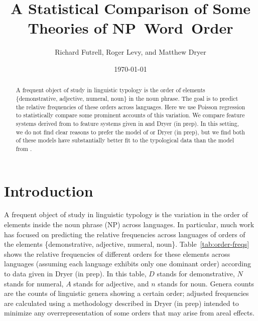 \documentclass[11pt]{article}
\title{A Statistical Comparison of Some Theories of NP~Word~Order}
\author{Richard Futrell, Roger Levy, and Matthew Dryer}
\date{\today}
\begin{document}
\maketitle
 
\begin{abstract}
  A frequent object of study in linguistic typology is the order of elements \{demonstrative, adjective, numeral, noun\} in the noun phrase. The goal is to predict the relative frequencies of these orders across languages. Here we use Poisson regression to statistically compare some prominent accounts of this variation. We compare feature systems derived from \citet{cinque2005deriving} to feature systems given in \citet{cysouw2010dealing} and Dryer (in prep). In this setting, we do not find clear reasons to prefer the model of \citet{cinque2005deriving} or Dryer (in prep), but we find both of these models have substantially better fit to the typological data than the model from \citet{cysouw2010dealing}.
\end{abstract}

\section{Introduction}

A frequent object of study in linguistic typology is the variation in the order of elements inside the noun phrase (NP) across languages.
In particular, much work has focused on predicting the relative frequencies across languages of orders of the elements \{demonstrative, adjective, numeral, noun\}.
Table~\ref{tab:order-freqs} shows the relative frequencies of different orders for these elements across languages (assuming each language exhibits only one dominant order) according to data given in Dryer (in prep).
In this table, $D$ stands for demonstrative, $N$ stands for numeral, $A$ stands for adjective, and $n$ stands for noun.
Genera counts are the counts of linguistic genera showing a certain
order; adjusted frequencies are calculated using a methodology
described in Dryer (in prep) intended to minimize any
overrepresentation of some orders that may arise from areal effects.
\end{document}
